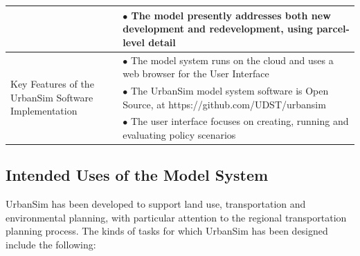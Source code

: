 \begin{table}[htp]
\begin{center}
\begin{tabular}{ p{1.5in}  p{4.4in}  }
& $\bullet$    The model presently addresses both new development and redevelopment, using parcel-level detail\\
\midrule
\multirow[c]{3}{1.5in}{Key Features of the UrbanSim Software Implementation}
&  $\bullet$   The model system runs on the cloud and uses a web browser for the User Interface\\
& $\bullet$  The UrbanSim model system software is Open Source, at https://github.com/UDST/urbansim\\
&  $\bullet$   The user interface focuses on creating, running and evaluating policy scenarios\\
\bottomrule
\end{tabular}
\end{center}
\end{table}

\subsection{Intended Uses of the Model System}

UrbanSim has been developed to support land use, transportation and
environmental planning, with particular attention to the regional
transportation planning process. The kinds of tasks for which UrbanSim
has been designed include the following:


